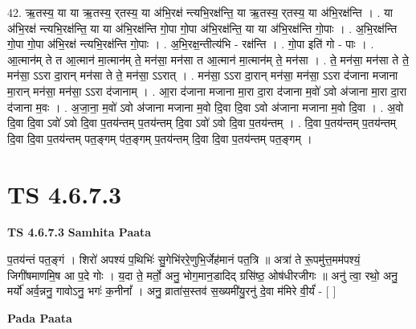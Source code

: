 \documentclass[17pt]{extarticle}
\begin{document}
42. ऋ॒तस्य॒ या या ऋ॒तस्य॒ र्‌तस्य॒ या अ॑भि॒रक्ष॑ न्त्यभि॒रक्ष॑न्ति॒ या ऋ॒तस्य॒ र्‌तस्य॒ या अ॑भि॒रक्ष॑न्ति । . या अ॑भि॒रक्ष॑ न्त्यभि॒रक्ष॑न्ति॒ या या अ॑भि॒रक्ष॑न्ति गो॒पा गो॒पा अ॑भि॒रक्ष॑न्ति॒ या या अ॑भि॒रक्ष॑न्ति गो॒पाः । . अ॒भि॒रक्ष॑न्ति गो॒पा गो॒पा अ॑भि॒रक्ष॑ न्त्यभि॒रक्ष॑न्ति गो॒पाः । . अ॒भि॒रक्ष॒न्तीत्य॑भि - रक्ष॑न्ति । . गो॒पा इति॑ गो - पाः । . आ॒त्मान॑म् ते त आ॒त्मान॑ मा॒त्मान॑म् ते॒ मन॑सा॒ मन॑सा त आ॒त्मान॑ मा॒त्मान॑म् ते॒ मन॑सा । . ते॒ मन॑सा॒ मन॑सा ते ते॒ मन॑सा॒ ऽऽरा दा॒रान् मन॑सा ते ते॒ मन॑सा॒ ऽऽरात् । . मन॑सा॒ ऽऽरा दा॒रान् मन॑सा॒ मन॑सा॒ ऽऽरा द॑जाना मजाना मा॒रान् मन॑सा॒ मन॑सा॒ ऽऽरा द॑जानाम् । . आ॒रा द॑जाना मजाना मा॒रा दा॒रा द॑जाना म॒वो॑ ऽवो अ॑जाना मा॒रा दा॒रा द॑जाना म॒वः । . अ॒जा॒ना॒ म॒वो॑ ऽवो अ॑जाना मजाना म॒वो दि॒वा दि॒वा ऽवो अ॑जाना मजाना म॒वो दि॒वा । . अ॒वो दि॒वा दि॒वा ऽवो॑ ऽवो दि॒वा प॒तय॑न्तम् प॒तय॑न्तम् दि॒वा ऽवो॑ ऽवो दि॒वा प॒तय॑न्तम् । . दि॒वा प॒तय॑न्तम् प॒तय॑न्तम् दि॒वा दि॒वा प॒तय॑न्तम् पत॒ङ्गम् प॑त॒ङ्गम् प॒तय॑न्तम् दि॒वा दि॒वा प॒तय॑न्तम् पत॒ङ्गम् । \newline
\pagebreak
{}

\section{ TS 4.6.7.3 }

\textbf{TS 4.6.7.3 } \newline
\textbf{Samhita Paata} \newline

प॒तय॑न्तं पत॒ङ्गं । शिरो॑ अपश्यं प॒थिभिः॑ सु॒गेभि॑ररे॒णुभि॒र्जेह॑मानं पत॒त्रि ॥ अत्रा॑ ते रू॒पमु॑त्त॒मम॑पश्यं॒ जिगी॑षमाणमि॒ष आ प॒दे गोः । य॒दा ते॒ मर्तो॒ अनु॒ भोग॒मान॒डादिद् ग्रसि॑ष्ठ॒ ओष॑धीरजीगः ॥ अनु॑ त्वा॒ रथो॒ अनु॒ मर्यो॑ अर्व॒न्ननु॒ गावोऽनु॒ भगः॑ क॒नीनां᳚ । अनु॒ व्राता॑स॒स्तव॑ स॒ख्यमी॑यु॒रनु॑ दे॒वा म॑मिरे वी॒र्यं॑ - [  ] \newline

\textbf{Pada Paata} \newline
\end{document}
